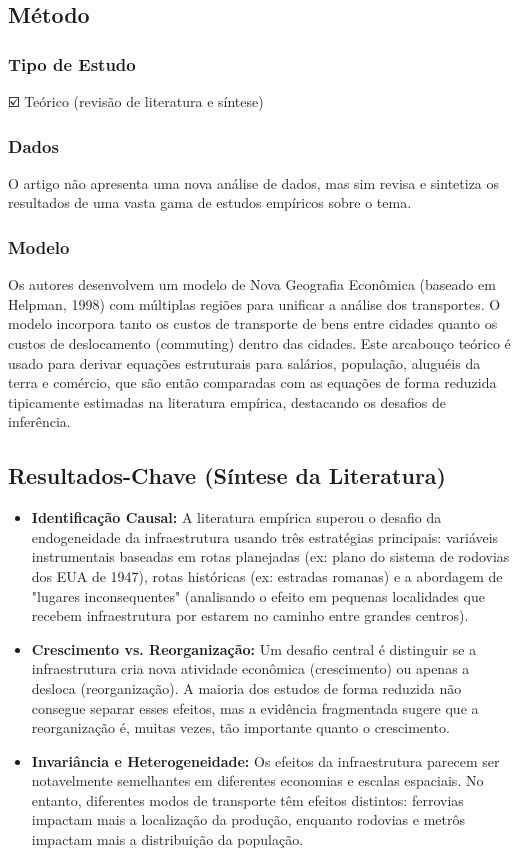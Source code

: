 \documentclass[12pt]{article}
\begin{document}
\subsection*{Método}

\subsubsection*{Tipo de Estudo}
☑️ Teórico (revisão de literatura e síntese)

\subsubsection*{Dados}
O artigo não apresenta uma nova análise de dados, mas sim revisa e sintetiza os resultados de uma vasta gama de estudos empíricos sobre o tema.

\subsubsection*{Modelo}
Os autores desenvolvem um modelo de Nova Geografia Econômica (baseado em Helpman, 1998) com múltiplas regiões para unificar a análise dos transportes. O modelo incorpora tanto os custos de transporte de bens entre cidades quanto os custos de deslocamento (commuting) dentro das cidades. Este arcabouço teórico é usado para derivar equações estruturais para salários, população, aluguéis da terra e comércio, que são então comparadas com as equações de forma reduzida tipicamente estimadas na literatura empírica, destacando os desafios de inferência.

\subsection*{Resultados-Chave (Síntese da Literatura)}
\begin{itemize}
    \item \textbf{Identificação Causal:} A literatura empírica superou o desafio da endogeneidade da infraestrutura usando três estratégias principais: variáveis instrumentais baseadas em rotas planejadas (ex: plano do sistema de rodovias dos EUA de 1947), rotas históricas (ex: estradas romanas) e a abordagem de "lugares inconsequentes" (analisando o efeito em pequenas localidades que recebem infraestrutura por estarem no caminho entre grandes centros).
    \item \textbf{Crescimento vs. Reorganização:} Um desafio central é distinguir se a infraestrutura cria nova atividade econômica (crescimento) ou apenas a desloca (reorganização). A maioria dos estudos de forma reduzida não consegue separar esses efeitos, mas a evidência fragmentada sugere que a reorganização é, muitas vezes, tão importante quanto o crescimento.
    \item \textbf{Invariância e Heterogeneidade:} Os efeitos da infraestrutura parecem ser notavelmente semelhantes em diferentes economias e escalas espaciais. No entanto, diferentes modos de transporte têm efeitos distintos: ferrovias impactam mais a localização da produção, enquanto rodovias e metrôs impactam mais a distribuição da população.
\end{itemize}
\end{document}
